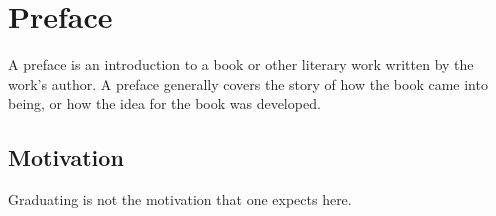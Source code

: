 

\chapter*{Preface}
A preface is an introduction to a book or other literary work
written by the work's author. A preface generally covers the story
of how the book came into being, or how the idea for the book was
developed.

\section*{Motivation}
Graduating is not the motivation that one expects here.
